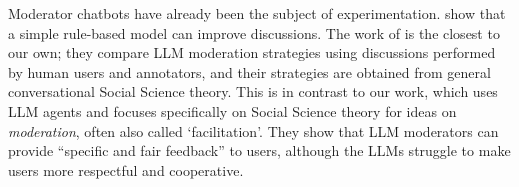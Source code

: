 Moderator chatbots have already been the subject of experimentation. \citet{kim_et_al_chatbot} show that a simple rule-based model can improve discussions. The work of \citet{cho-etal-2024-language} 
is the closest to our own; they compare \ac{LLM} moderation strategies using discussions performed by human users and annotators, and their strategies are obtained from general conversational Social Science theory. This is in contrast to our work, which uses \ac{LLM} agents and focuses specifically on Social Science theory for ideas on  \emph{moderation}, often also called `facilitation'. 
They show that \ac{LLM} moderators can provide “specific and fair feedback” to users, although the \acp{LLM} struggle to make users more respectful and cooperative.

